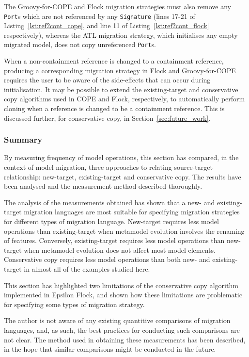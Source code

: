 The Groovy-for-COPE and Flock migration strategies must also remove any \texttt{Port}s which are not referenced by any \texttt{Signature} (lines 17-21 of Listing~\ref{lst:ref2cont_cope}, and line 11 of Listing~\ref{lst:ref2cont_flock} respectively), whereas the ATL migration strategy, which initialises any empty migrated model, does not copy unreferenced \texttt{Port}s.

When a non-containment reference is changed to a containment reference, producing a corresponding migration strategy in Flock and Groovy-for-COPE requires the user to be aware of the side-effects that can occur during initialisation. It may be possible to extend the existing-target and conservative copy algorithms used in COPE and Flock, respectively, to automatically perform cloning when a reference is changed to be a containment reference. This is discussed further, for conservative copy, in Section~\ref{sec:future_work}.


\subsubsection{Summary}
By measuring frequency of model operations, this section has compared, in the context of model migration, three approaches to relating source-target relationship: new-target, existing-target and conservative copy. The results have been analysed and the measurement method described thoroughly.

The analysis of the measurements obtained has shown that a new- and existing-target migration languages are most suitable for specifying migration strategies for different types of migration language. New-target requires less model operations than existing-target when metamodel evolution involves the renaming of features. Conversely, existing-target requires less model operations than new-target when metamodel evolution does not affect most model elements. Conservative copy requires less model operations than both new- and existing-target in almost all of the examples studied here.

This section has highlighted two limitations of the conservative copy algorithm implemented in Epsilon Flock, and shown how these limitations are problematic for specifying some types of migration strategy. 

The author is not aware of any existing quantitive comparisons of migration languages, and, as such, the best practices for conducting such comparisons are not clear. The method used in obtaining these measurements has been described, in the hope that similar comparisons might be conducted in the future. 
